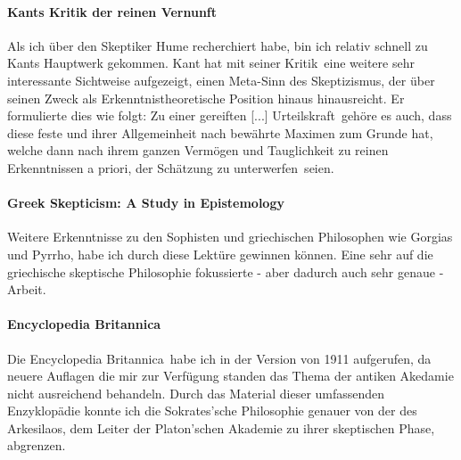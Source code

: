 \documentclass[12pt,a4paper,final]{article}
\begin{document}
\paragraph{Kants \glqq Kritik der reinen Vernunft\grqq\ \cite{kritik}} Als ich über den Skeptiker Hume recherchiert habe, bin ich relativ schnell zu Kants Hauptwerk gekommen. Kant hat mit seiner \glqq Kritik\grqq\ eine weitere sehr interessante Sichtweise aufgezeigt, einen Meta-Sinn des Skeptizismus, der über seinen Zweck als Erkenntnistheoretische Position hinaus hinausreicht. Er formulierte dies wie folgt: Zu einer \glqq gereiften [...] Urteilskraft\grqq\ gehöre es auch, dass diese \glqq feste und ihrer Allgemeinheit nach bewährte Maximen zum Grunde hat\grqq, welche dann \glqq nach ihrem ganzen Vermögen und Tauglichkeit zu reinen Erkenntnissen a priori, der Schätzung zu unterwerfen\grqq\ seien.
\paragraph*{Greek Skepticism: A Study in Epistemology \cite{greek_stough}} Weitere Erkenntnisse zu den Sophisten und griechischen Philosophen wie Gorgias und Pyrrho, habe ich durch diese Lektüre gewinnen können. Eine sehr auf die griechische skeptische Philosophie fokussierte - aber dadurch auch sehr genaue - Arbeit.
\paragraph*{Encyclopedia Britannica \cite{enc_brit}} Die \glqq Encyclopedia Britannica\grqq\ habe ich in der Version von 1911 aufgerufen, da neuere Auflagen die mir zur Verfügung standen das Thema der antiken Akedamie nicht ausreichend behandeln. Durch das Material dieser umfassenden Enzyklopädie konnte ich die Sokrates'sche Philosophie genauer von der des Arkesilaos, dem Leiter der Platon'schen Akademie zu ihrer skeptischen Phase, abgrenzen.
\nocite{*}
\printbibliography
\end{document}
